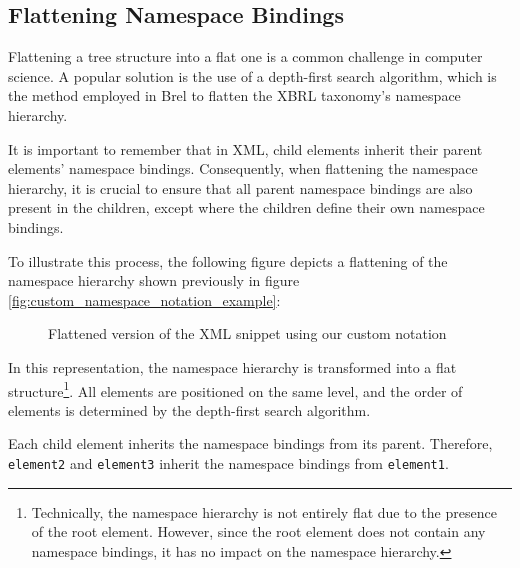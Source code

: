 \subsection{Flattening Namespace Bindings}


Flattening a tree structure into a flat one is a common challenge in computer science.
A popular solution is the use of a depth-first search algorithm,
which is the method employed in Brel to flatten the XBRL taxonomy's namespace hierarchy.

It is important to remember that in XML, child elements inherit their parent elements' namespace bindings.
Consequently, when flattening the namespace hierarchy,
it is crucial to ensure that all parent namespace bindings are also present in the children,
except where the children define their own namespace bindings.

To illustrate this process, the following figure depicts a flattening of the namespace hierarchy shown previously in figure \ref{fig:custom_namespace_notation_example}:

\begin{figure}[H]
    \caption{Flattened version of the XML snippet using our custom notation}
    \label{fig:custom_namespace_notation_example_flattened}
\end{figure}

In this representation, the namespace hierarchy is transformed into a flat structure\footnote{Technically, the namespace hierarchy is not entirely flat due to the presence of the root element.
However, since the root element does not contain any namespace bindings, it has no impact on the namespace hierarchy.}.
All elements are positioned on the same level, and the order of elements is determined by the depth-first search algorithm.

Each child element inherits the namespace bindings from its parent.
Therefore, \texttt{element2} and \texttt{element3} inherit the namespace bindings from \texttt{element1}.

